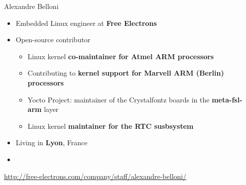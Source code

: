 \begin{frame}{Alexandre Belloni}
    \begin{itemize}
      \item Embedded Linux engineer at {\bf Free Electrons}
      \item Open-source contributor
        \begin{itemize}
          \item Linux kernel {\bf co-maintainer for Atmel ARM
            processors}
          \item Contributing to {\bf kernel support for Marvell
            ARM (Berlin) processors}
          \item Yocto Project: maintainer of the Crystalfontz boards
            in the {\bf meta-fsl-arm} layer
          \item Linux kernel {\bf maintainer for the RTC susbsystem}
        \end{itemize}
      \item Living in {\bf Lyon}, France
      \item {}
    \end{itemize}
    {\small \url{http://free-electrons.com/company/staff/alexandre-belloni/}}
\end{frame}

